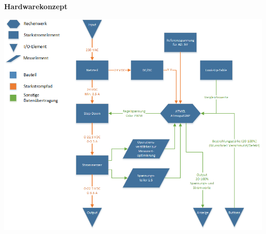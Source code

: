 \documentclass{fhnwreport}
\begin{document}
\textbf{Hardwarekonzept}\\
\begin{center}
\includegraphics[scale=0.7]{Hardwarekonzept_V3}
\end{center}
\end{document}
